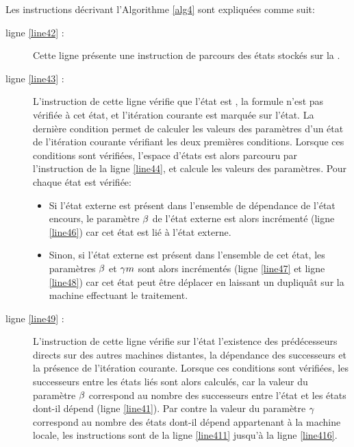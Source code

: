 Les instructions décrivant l'Algorithme \ref{alg4} sont expliquées comme suit:

\begin{description}
	\item[ligne \ref{line42} :]  Cette ligne présente une instruction de parcours des états stockés sur la \mi{}.
	\item[ligne \ref{line43} :]  L'instruction de cette ligne vérifie que l'état est , la formule n'est pas vérifiée à cet état, et l'itération courante est marquée sur l'état. La dernière condition permet de calculer les valeurs des paramètres d'un état de l'itération courante vérifiant les deux premières conditions. Lorsque ces conditions sont vérifiées, l'espace d'états est alors parcouru par l'instruction de la ligne \ref{line44}, et calcule les valeurs des paramètres. Pour chaque état est vérifiée:
	
	\begin{itemize}
	\item Si l'état externe est présent dans l'ensemble de dépendance de l'état encours, le paramètre $\beta{}$ de l'état externe est alors incrémenté (ligne \ref{line46}) car cet état est lié à l'état externe.
	\item Sinon, si l'état externe est présent dans l'ensemble  de cet état, les paramètres $\beta{}$ et $  \gamma m{}$ sont alors incrémentés (ligne \ref{line47} et ligne \ref{line48}) car cet état peut être déplacer en laissant un dupliquât sur la machine effectuant le traitement.  
	\end{itemize}
	
	\item[ligne \ref{line49} :] L'instruction de cette ligne vérifie sur l'état l'existence des prédécesseurs directs sur des autres machines distantes, la dépendance des successeurs et la présence de l'itération courante. Lorsque ces conditions sont vérifiées, les successeurs  entre les états liés sont alors calculés, car la valeur du paramètre $\beta{}$ correspond au nombre des successeurs entre l'état et les états dont-il dépend (ligne \ref{line41}). Par contre la valeur du paramètre $\gamma{}$ correspond au nombre des états dont-il dépend appartenant à la machine locale, les instructions sont de la ligne \ref{line411} jusqu'à la ligne \ref{line416}.
\end{description}

